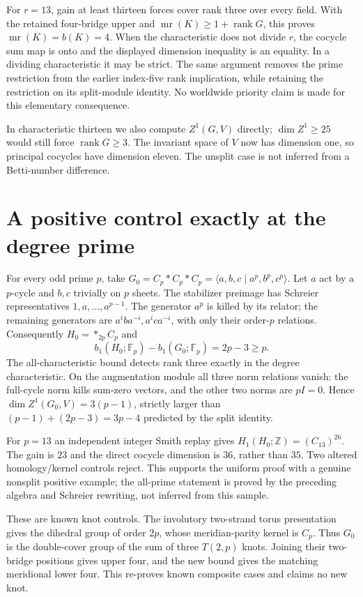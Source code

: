 \documentclass[11pt]{article}
\newcommand{\F}{\mathbb F}
\newcommand{\rank}{\operatorname{rank}}
\newcommand{\mr}{\operatorname{mr}}
\begin{document}
For $r=13$, gain at least thirteen forces cover rank three
over every field. With the retained four-bridge upper and
$\mr(K)\ge1+\rank G$, this proves $\mr(K)=b(K)=4$.
When the characteristic does not divide $r$, the cocycle sum
map is onto and the displayed dimension inequality is an
equality. In a dividing characteristic it may be strict.
The same argument removes the prime restriction from the
earlier index-five rank implication, while retaining the
restriction on its split-module identity. No worldwide
priority claim is made for this elementary consequence.

In characteristic thirteen we also compute $Z^1(G,V)$ directly;
$\dim Z^1\ge25$ would still force $\rank G\ge3$. The invariant
space of $V$ now has dimension one, so principal cocycles
have dimension eleven. The unsplit case is not inferred
from a Betti-number difference.

\section{A positive control exactly at the degree prime}

For every odd prime $p$, take
$G_0=C_p*C_p*C_p=\langle a,b,c\mid a^p,b^p,c^p\rangle$.
Let $a$ act by a $p$-cycle and $b,c$ trivially on $p$ sheets.
The stabilizer preimage has Schreier representatives
$1,a,\ldots,a^{p-1}$. The generator $a^p$ is killed by its
relator; the remaining generators are
$a^iba^{-i},a^ica^{-i}$, with only their order-$p$ relations.
Consequently $H_0=*_{2p}C_p$ and
\[
 b_1(H_0;\F_p)-b_1(G_0;\F_p)=2p-3\ge p.
\]
The all-characteristic bound detects rank three exactly in
the degree characteristic. On the augmentation module all
three norm relations vanish: the full-cycle norm kills
sum-zero vectors, and the other two norms are $pI=0$.
Hence $\dim Z^1(G_0,V)=3(p-1)$, strictly larger than
$(p-1)+(2p-3)=3p-4$ predicted by the split identity.

For $p=13$ an independent integer Smith replay gives
$H_1(H_0;\mathbb Z)=(C_{13})^{26}$. The gain is $23$ and
the direct cocycle dimension is $36$, rather than $35$.
Two altered homology/kernel controls reject. This supports
the uniform proof with a genuine nonsplit positive example;
the all-prime statement is proved by the preceding algebra
and Schreier rewriting, not inferred from this sample.

These are known knot controls. The involutory two-strand
torus presentation gives the dihedral group of order $2p$,
whose meridian-parity kernel is $C_p$. Thus $G_0$ is the
double-cover group of the sum of three $T(2,p)$ knots.
Joining their two-bridge positions gives upper four, and
the new bound gives the matching meridional lower four.
This re-proves known composite cases and claims no new knot.
\end{document}
